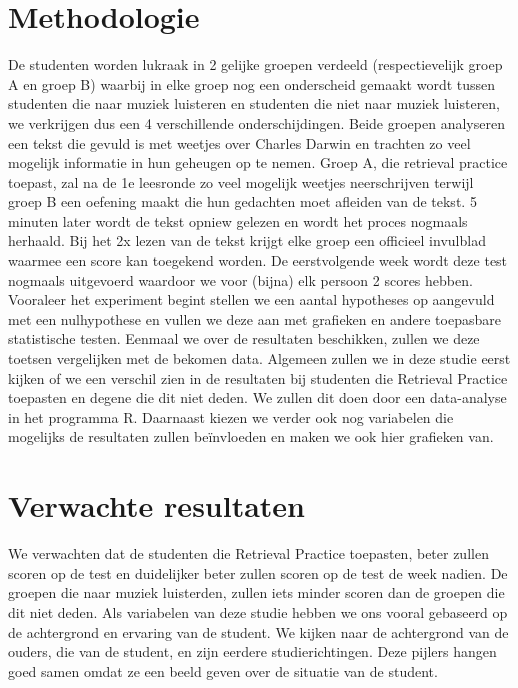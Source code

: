 \documentclass{hogent-article}
\begin{document}
	
	\section{Methodologie}
	
	De studenten worden lukraak in 2 gelijke groepen verdeeld (respectievelijk groep A en groep B) waarbij in elke groep nog een onderscheid gemaakt wordt tussen studenten die naar muziek luisteren en studenten die niet naar muziek luisteren, we verkrijgen dus een 4 verschillende onderschijdingen. Beide groepen analyseren een tekst die gevuld is met weetjes over Charles Darwin en trachten zo veel mogelijk informatie in hun geheugen op te nemen. Groep A, die retrieval practice toepast, zal na de 1e leesronde zo veel mogelijk weetjes neerschrijven terwijl groep B een oefening maakt die hun gedachten moet afleiden van de tekst. 5 minuten later wordt de tekst opniew gelezen en wordt het proces nogmaals herhaald. Bij het 2x lezen van de tekst krijgt elke groep een officieel invulblad waarmee een score kan toegekend worden. De eerstvolgende week wordt deze test nogmaals uitgevoerd waardoor we voor (bijna) elk persoon 2 scores hebben. 
	Vooraleer het experiment begint stellen we een aantal hypotheses op aangevuld met een nulhypothese en vullen we deze aan met grafieken en andere toepasbare statistische testen. Eenmaal we over de resultaten beschikken, zullen we deze toetsen vergelijken met de bekomen data.
	Algemeen zullen we in deze studie eerst kijken of we een verschil zien in de resultaten bij studenten die Retrieval Practice toepasten en degene die dit niet deden. We zullen dit doen door een data-analyse in het programma R. Daarnaast kiezen we verder ook nog variabelen die mogelijks de resultaten zullen beïnvloeden en maken we ook hier grafieken van.
	
	\section{Verwachte resultaten}
	\label{sec:verwachte_resultaten}
	We verwachten dat de studenten die Retrieval Practice toepasten, beter zullen scoren op de test en duidelijker beter zullen scoren op de test de week nadien. De groepen die naar muziek luisterden, zullen iets minder scoren dan de groepen die dit niet deden. Als variabelen van deze studie hebben we ons vooral gebaseerd op de achtergrond en ervaring van de student. We kijken naar de achtergrond van de ouders, die van de student, en zijn eerdere studierichtingen. Deze pijlers hangen goed samen omdat ze een beeld geven over de situatie van de student.
	
\end{document}
